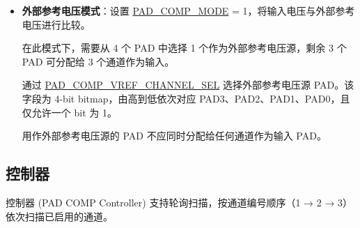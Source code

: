 \documentclass[main\_\_CN.tex]{subfiles}
\begin{document}
\begin{itemize}
    \item \textbf{外部参考电压模式}：设置 \hyperref[fielddesc:PADCOMPMODE]{PAD\_COMP\_MODE} = 1，将输入电压与外部参考电压进行比较。

    在此模式下，需要从 4 个 PAD 中选择 1 个作为外部参考电压源，剩余 3 个 PAD 可分配给 3 个通道作为输入。

    通过 \hyperref[fielddesc:PADCOMPVREFCHANNELSEL]{PAD\_COMP\_VREF\_CHANNEL\_SEL} 选择外部参考电压源 PAD。该字段为 4-bit bitmap，由高到低依次对应 PAD3、PAD2、PAD1、PAD0，且仅允许一个 bit 为 1。

    \begin{tiplisting}
    用作外部参考电压源的 PAD 不应同时分配给任何通道作为输入 PAD。
    \end{tiplisting}

\end{itemize}

\subsection{控制器}
\label{subsec:anacom-controller}
             
控制器 (PAD COMP Controller) 支持轮询扫描，按通道编号顺序（1 → 2 → 3）依次扫描已启用的通道。
\end{document}
